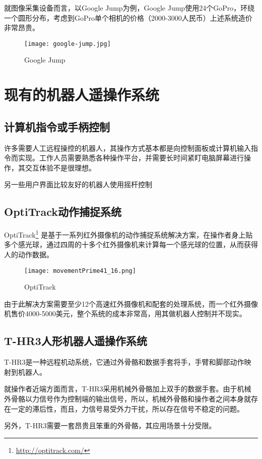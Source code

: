 就图像采集设备而言，以Google Jump为例，Google Jump使用24个GoPro，环绕一个圆形分布，考虑到GoPro单个相机的价格（2000-3000人民币）上述系统造价非常昂贵。
\begin{figure}[htbp]
\small
\centering
\texttt{[image: google-jump.jpg]}
\caption{Google Jump} 
\end{figure}

\section{现有的机器人遥操作系统}

\subsection{计算机指令或手柄控制}
许多需要人工远程操控的机器人，其操作方式基本都是向控制面板或计算机输入指令而实现。工作人员需要熟悉各种操作平台，并需要长时间紧盯电脑屏幕进行操作，其交互体验不是很理想。

另一些用户界面比较友好的机器人使用摇杆控制

\subsection{OptiTrack动作捕捉系统}
OptiTrack\footnote{\url{http://optitrack.com/}} 是基于一系列红外摄像机的动作捕捉系统解决方案，在操作者身上贴多个感光球，通过四周的十多个红外摄像机来计算每一个感光球的位置，从而获得人的动作数据。
\begin{figure}[H]
\small
\centering
\texttt{[image: movementPrime41\_16.png]}
\caption{OptiTrack} 
\end{figure}
由于此解决方案需要至少12个高速红外摄像机和配套的处理系统，而一个红外摄像机售价4000-5000美元，整个系统的成本非常高，用其做机器人控制并不现实。

\subsection{T-HR3人形机器人遥操作系统}

T-HR3是一种远程机动系统，它通过外骨骼和数据手套将手，手臂和脚部动作映射到机器人。

就操作者近端方面而言，T-HR3采用机械外骨骼加上双手的数据手套。由于机械外骨骼以力信号作为控制端的输出信号，所以，机械外骨骼和操作者之间本身就存在一定的滞后性，而且，力信号易受外力干扰，所以存在信号不稳定的问题。

另外，T-HR3需要一套昂贵且笨重的外骨骼，其应用场景十分受限。

